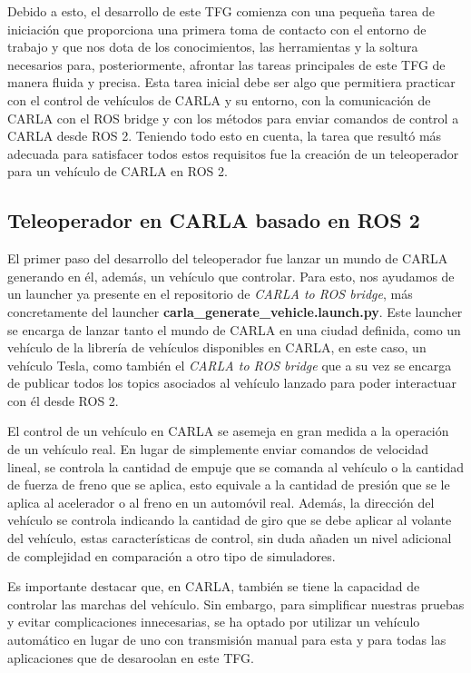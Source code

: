 \bigskip

Debido a esto, el desarrollo de este \ac{TFG} comienza con una pequeña tarea de iniciación que proporciona una primera toma de contacto con el entorno de trabajo y que nos dota de los conocimientos, las herramientas y la soltura necesarios para, posteriormente, afrontar las tareas principales de este \ac{TFG} de manera fluida y precisa. Esta tarea inicial debe ser algo que permitiera practicar con el control de vehículos de CARLA y su entorno, con la comunicación de CARLA con el ROS bridge y con los métodos para enviar comandos de control a CARLA desde ROS 2. Teniendo todo esto en cuenta, la tarea que resultó más adecuada para satisfacer todos estos requisitos fue la creación de un teleoperador para un vehículo de CARLA en ROS 2.

\subsection{Teleoperador en CARLA basado en ROS 2}
\label{Teleoperador en CARLA basado en ROS2}

El primer paso del desarrollo del teleoperador fue lanzar un mundo de CARLA generando en él, además, un vehículo que controlar. Para esto, nos ayudamos de un launcher ya presente en el repositorio de \textit{CARLA to ROS bridge}, más concretamente del launcher \textbf{carla\_generate\_vehicle.launch.py}. Este launcher se encarga de lanzar tanto el mundo de CARLA en una ciudad definida, como un vehículo de la librería de vehículos disponibles en CARLA, en este caso, un vehículo Tesla, como también el \textit{CARLA to ROS bridge} que a su vez se encarga de publicar todos los topics asociados al vehículo lanzado para poder interactuar con él desde ROS 2.

\bigskip

El control de un vehículo en CARLA se asemeja en gran medida a la operación de un vehículo real. En lugar de simplemente enviar comandos de velocidad lineal, se controla la cantidad de empuje que se comanda al vehículo o la cantidad de fuerza de freno que se aplica, esto equivale a la cantidad de presión que se le aplica al acelerador o al freno en un automóvil real. Además, la dirección del vehículo se controla indicando la cantidad de giro que se debe aplicar al volante del vehículo, estas características de control, sin duda añaden un nivel adicional de complejidad en comparación a otro tipo de simuladores.

\bigskip
Es importante destacar que, en CARLA, también se tiene la capacidad de controlar las marchas del vehículo. Sin embargo, para simplificar nuestras pruebas y evitar complicaciones innecesarias, se ha optado por utilizar un vehículo automático en lugar de uno con transmisión manual para esta y para todas las aplicaciones que de desaroolan en este \ac{TFG}.
\bigskip

